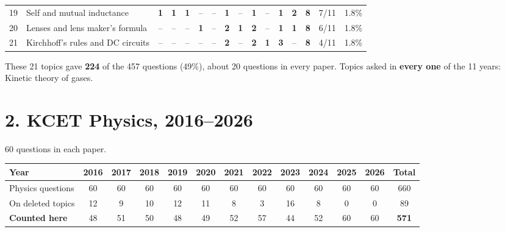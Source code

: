 \documentclass[10pt,a4paper]{article}
\begin{document}
{\begin{tabularx}{\linewidth}{@{}r>{\raggedright\arraybackslash}X*{11}{c}ccc@{}}
19 & Self and mutual inductance & \textbf{1} & \textbf{1} & \textbf{1} & {\color{gray!60}--} & {\color{gray!60}--} & \textbf{1} & {\color{gray!60}--} & \textbf{1} & {\color{gray!60}--} & \textbf{1} & \textbf{2} & \textbf{8} & 7/11 & 1.8\%\\
20 & Lenses and lens maker's formula & {\color{gray!60}--} & {\color{gray!60}--} & {\color{gray!60}--} & \textbf{1} & {\color{gray!60}--} & \textbf{2} & \textbf{1} & \textbf{2} & {\color{gray!60}--} & \textbf{1} & \textbf{1} & \textbf{8} & 6/11 & 1.8\%\\
21 & Kirchhoff's rules and DC circuits & {\color{gray!60}--} & {\color{gray!60}--} & {\color{gray!60}--} & {\color{gray!60}--} & {\color{gray!60}--} & \textbf{2} & {\color{gray!60}--} & \textbf{2} & \textbf{1} & \textbf{3} & {\color{gray!60}--} & \textbf{8} & 4/11 & 1.8\%\\
\bottomrule\end{tabularx}}\par\smallskip
{\small These 21 topics gave \textbf{224} of the 457 questions (49\%), about 20 questions in every paper.
Topics asked in \textbf{every one} of the 11 years: Kinetic theory of gases.}

\clearpage
\section*{2. KCET Physics, 2016--2026}
{\small 60 questions in each paper.}\par\medskip
\begin{tabular*}{\linewidth}{@{\extracolsep{\fill}}l*{11}{c}c@{}}\toprule
Year & 2016 & 2017 & 2018 & 2019 & 2020 & 2021 & 2022 & 2023 & 2024 & 2025 & 2026 & Total\\\midrule
Physics questions & 60 & 60 & 60 & 60 & 60 & 60 & 60 & 60 & 60 & 60 & 60 & 660\\
On deleted topics & 12 & 9 & 10 & 12 & 11 & 8 & 3 & 16 & 8 & 0 & 0 & 89\\
\textbf{Counted here} & 48 & 51 & 50 & 48 & 49 & 52 & 57 & 44 & 52 & 60 & 60 & \textbf{571}\\\bottomrule\end{tabular*}\par\bigskip
\end{document}
